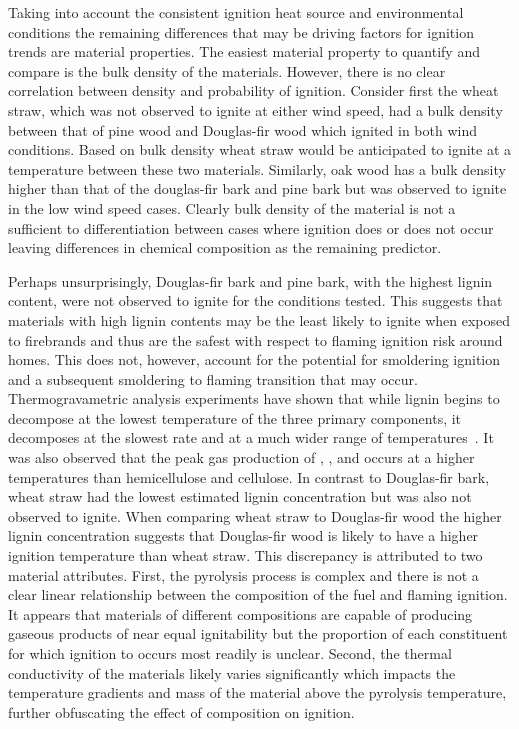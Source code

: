     Taking into account the consistent ignition heat source and environmental conditions the remaining differences that may be driving factors for ignition trends are material properties. 
    The easiest material property to quantify and compare is the bulk density of the materials. However, there is no clear correlation between density and probability of ignition. Consider first the wheat straw, which was not observed to ignite at either wind speed, had a bulk density between that of pine wood and Douglas-fir wood which ignited in both wind conditions. Based on bulk density wheat straw would be anticipated to ignite at a temperature between these two materials. Similarly, oak wood has a bulk density higher than that of the douglas-fir bark and pine bark but was observed to ignite in the low wind speed cases. Clearly bulk density of the material is not a sufficient to differentiation between cases where ignition does or does not occur leaving differences in chemical composition as the remaining predictor. 
    
    Perhaps unsurprisingly, Douglas-fir bark and pine bark, with the highest lignin content, were not observed to ignite for the conditions tested. This suggests that materials with high lignin contents may be the least likely to ignite when exposed to firebrands and thus are the safest with respect to flaming ignition risk around homes. This does not, however, account for the potential for smoldering ignition and a subsequent smoldering to flaming transition that may occur. Thermogravametric analysis experiments have shown that while lignin begins to decompose at the lowest temperature of the three primary components, it decomposes at the slowest rate and at a much wider range of temperatures~\cite{Yang2007a}. It was also observed that the peak gas production of , , and  occurs at a higher temperatures than hemicellulose and cellulose. In contrast to Douglas-fir bark, wheat straw had the lowest estimated lignin concentration but was also not observed to ignite. When comparing wheat straw to Douglas-fir wood the higher lignin concentration suggests that Douglas-fir wood is likely to have a higher ignition temperature than wheat straw. This discrepancy is attributed to two material attributes. First, the pyrolysis process is complex and there is not a clear linear relationship between the composition of the fuel and flaming ignition. It appears that materials of different compositions are capable of producing gaseous products of near equal ignitability but the proportion of each constituent for which ignition to occurs most readily is unclear. Second, the thermal conductivity of the materials likely varies significantly which impacts the temperature gradients and mass of the material above the pyrolysis temperature, further obfuscating the effect of composition on ignition. 
    
